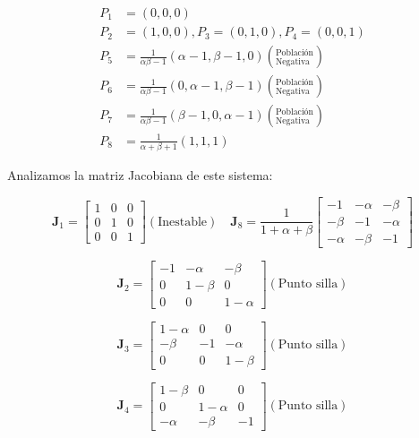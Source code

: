 \documentclass[twocolumn,aps,prl]{revtex4-1}
\begin{document}
$$
\begin{aligned}
    P_1 &= (0, 0, 0) \\ 
    P_2 &= (1, 0, 0), P_3 = (0, 1, 0), P_4 = (0, 0, 1) \\
    P_5 &= \frac{1}{\alpha \beta - 1} 
                       (\alpha - 1, \beta - 1 , 0)  \left(^\text{Población}_\text{Negativa} \right)  \\ 
    P_6 &= \frac{1}{\alpha \beta - 1} 
                       (0         , \alpha - 1, \beta - 1)  \left(^\text{Población}_\text{Negativa} \right)  \\ 
    P_7 &= \frac{1}{\alpha \beta - 1} 
                       (\beta - 1 , 0         , \alpha - 1)  \left(^\text{Población}_\text{Negativa} \right)  \\ 
    P_8 &= \frac{1}{\alpha + \beta + 1}(1, 1, 1) 
\end{aligned}
$$

Analizamos la matriz Jacobiana de este sistema:

$$
\mathbf{J}_1 = 
\begin{bmatrix}
    1  & 0 & 0 \\
    0 & 1 & 0 \\
    0 & 0 & 1
\end{bmatrix} (\text{Inestable})
\quad 
\mathbf{J}_8 = 
\frac{1}{1+\alpha+\beta}\begin{bmatrix}
    -1 & -\alpha & -\beta \\
    -\beta & -1 & -\alpha \\
    -\alpha & -\beta & -1
\end{bmatrix}
$$

$$
\mathbf{J}_2 = 
\begin{bmatrix}
    -1 & - \alpha & - \beta \\
    0 & 1-\beta & 0 \\
    0 & 0 & 1- \alpha
\end{bmatrix} (\text{Punto silla})
$$

$$
\mathbf{J}_3 = 
\begin{bmatrix}
    1 - \alpha  & 0 & 0 \\
    - \beta & -1 & - \alpha \\
    0 & 0 & 1  - \beta
\end{bmatrix} (\text{Punto silla})
$$

$$
\mathbf{J}_4 = 
\begin{bmatrix}
    1 - \beta  & 0 & 0 \\
    0 & 1 -\alpha  & 0 \\
    - \alpha  & -\beta & -1
\end{bmatrix} (\text{Punto silla})
$$
\end{document}
